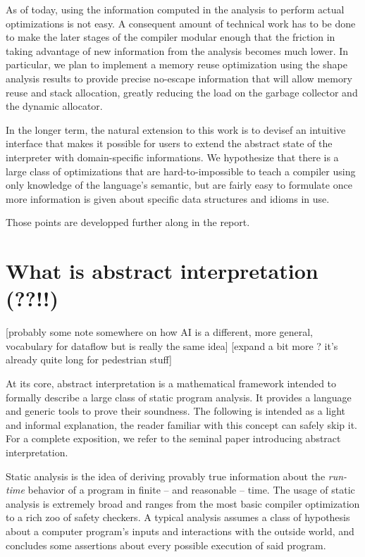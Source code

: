 \documentclass[11pt]{article}
\begin{document}
As of today, using the information computed in the analysis to perform actual optimizations is not easy.
A consequent amount of technical work has to be done to make the later stages of the compiler modular enough that the friction in taking advantage of new information from the analysis becomes much lower. In particular, we plan to implement a memory reuse optimization using the shape analysis results to provide precise no-escape information that will allow memory reuse and stack allocation, greatly reducing the load on the garbage collector and the dynamic allocator.

In the longer term, the natural extension to this work is to devisef an intuitive interface that makes it possible for users to extend the abstract state of the interpreter with domain-specific informations. We hypothesize that there is a large class of optimizations that are hard-to-impossible to teach a compiler using only knowledge of the language's semantic, but are fairly easy to formulate once more information is given about specific data structures and idioms in use.

Those points are developped further along in the report.

\break

\section*{What is abstract interpretation (??!!)}

[probably some note somewhere on how AI is a different, more general, vocabulary for dataflow but is really the same idea]
[expand a bit more ? it's already quite long for pedestrian stuff]


At its core, abstract interpretation is a mathematical framework intended to formally describe a large class of static program analysis.
It provides a language and generic tools to prove their soundness.
The following is intended as a light and informal explanation, the reader familiar with this concept can safely skip it. For a complete exposition, we refer to the seminal paper introducing abstract interpretation\cite{absint-cousot}.

Static analysis is the idea of deriving provably true information about the \emph{run-time} behavior of a program in finite -- and reasonable -- time.
The usage of static analysis is extremely broad and ranges from the most basic compiler optimization to a rich zoo of safety checkers.
A typical analysis assumes a class of hypothesis about a computer program's inputs and interactions with the outside world, and concludes some assertions
about every possible execution of said program.
\end{document}
